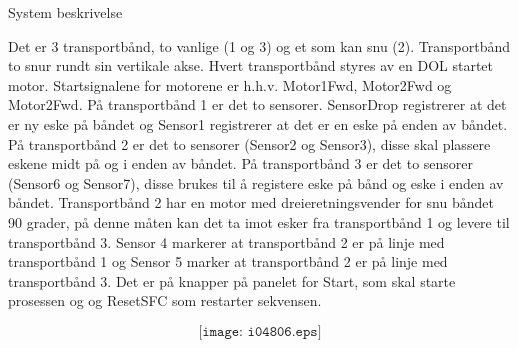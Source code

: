 \documentclass[12pt,norsk,a4paper]{book}
\begin{document}

System beskrivelse

Det er 3 transportbånd, to vanlige (1 og 3) og et som kan snu (2). Transportbånd to snur rundt sin vertikale akse. Hvert transportbånd styres av en DOL startet motor. Startsignalene
for motorene er h.h.v. Motor1Fwd, Motor2Fwd og Motor2Fwd. På transportbånd 1 er det to sensorer. SensorDrop registrerer at det er ny eske på båndet og Sensor1 registrerer at det er en eske på enden av båndet. På transportbånd 2 er det to sensorer (Sensor2 og Sensor3), disse skal plassere eskene midt på og i enden av båndet. På transportbånd 3 er det to sensorer (Sensor6 og Sensor7), disse brukes til å registere eske på bånd og eske i enden av båndet. Transportbånd 2 har en motor med dreieretningsvender for snu båndet 90 grader, på denne måten kan det ta imot esker fra transportbånd 1 og levere til transportbånd 3. Sensor 4 markerer at transportbånd 2 er på linje med transportbånd 1 og Sensor 5 marker at transportbånd 2 er på linje med transportbånd 3. Det er på knapper på panelet for Start, som skal starte prosessen og og ResetSFC som restarter sekvensen.   

$$\texttt{[image: i04806.eps]}$$
\end{document}
